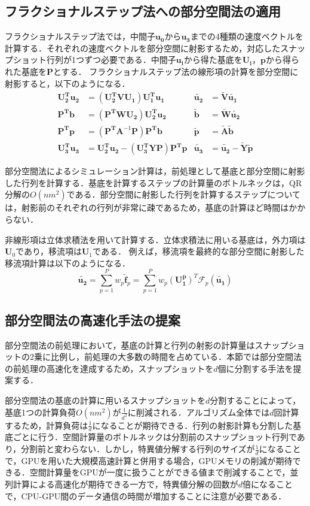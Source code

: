 \documentclass[uplatex,dvipdfmx,10pt,a4paper,notitlepage,oneside,twocolumn]{abst_jsarticle}
\begin{document}
\subsection{フラクショナルステップ法への部分空間法の適用}
フラクショナルステップ法では，中間子$\bm{u_0}$から$\bm{u_3}$までの4種類の速度ベクトルを計算する．それぞれの速度ベクトルを部分空間に射影するため，対応したスナップショット行列が1つずつ必要である．中間子$\bm{u_i}$から得た基底を$\bm{U_i}$，$\bm{p}$から得られた基底を$\bm{P}$とする．
フラクショナルステップ法の線形項の計算を部分空間に射影すると，以下のようになる．
\begin{align*}
 \bm{U_2^T}\bm{u_2}	& = (\bm{U_2^T}\bm{V}\bm{U_1})\bm{U_1^T}\bm{u_1} 					&\bm{\tilde{u_2}} 		&= \bm{\tilde{V}}\bm{\tilde{u_1}}	\\
 \bm{P^T}\bm{b}		& = (\bm{P^T}\bm{W}\bm{U_2})\bm{U_2^T}\bm{u_2}        				&\bm{\tilde{b}}			&= \bm{\tilde{W}}\bm{\tilde{u_2}}	\\
 \bm{P^T}\bm{p} 		&= (\bm{P^T}\bm{A}^{-1}\bm{P})\bm{P^T}\bm{b}						&\bm{\tilde{p}}			&= \bm{\tilde{A}}\bm{\tilde{b}}\\
 \bm{U_3^T}\bm{u_3} 	&=  \bm{U_2^T}\bm{u_2} - (\bm{U_3^T}\bm{Y}\bm{P})\bm{P^T}\bm{p}	&\bm{\tilde{u_3}}		&= \bm{\tilde{u_2}}  -  \bm{\tilde{Y}}\bm{\tilde{p}}
\end{align*}

部分空間法によるシミュレーション計算は，前処理として基底と部分空間に射影した行列を計算する．基底を計算するステップの計算量のボトルネックは，QR分解の$O(nm^2)$である．部分空間に射影した行列を計算するステップについては，射影前のそれぞれの行列が非常に疎であるため，基底の計算ほど時間はかからない．

非線形項は立体求積法を用いて計算する．立体求積法に用いる基底は，外力項は$\bm{U}_0$であり，移流項は$\bm{U}_1$である．
例えば，移流項を最終的な部分空間に射影した移流項計算は以下のようになる．
\[
	\bm{\tilde{u_2}} = \sum_{p=1}^Pw_p\bm{\tilde{f}}_p =   \sum_{p=1}^Pw_p(\bm{U^p_1})^T\mathcal{F}_p(\bm{\tilde{u_1}})
\]
\subsection{部分空間法の高速化手法の提案}
部分空間法の前処理において，基底の計算と行列の射影の計算量はスナップショットの$2$乗に比例し，前処理の大多数の時間を占めている．本節では部分空間法の前処理の高速化を達成するため，スナップショットを$d$個に分割する手法を提案する．

部分空間法の基底の計算に用いるスナップショットを$d$分割することによって，基底1つの計算負荷$O(nm^2)$が$\frac{1}{d^2}$に削減される．アルゴリズム全体では$d$回計算するため，計算負荷は$\frac{1}{d}$になることが期待できる．行列の射影計算も分割した基底ごとに行う．空間計算量のボトルネックは分割前のスナップショット行列であり，分割前と変わらない．しかし，特異値分解する行列のサイズが$\frac{1}{d}$になることで，GPUを用いた大規模高速計算と併用する場合，GPUメモリの削減が期待できる．空間計算量をGPUが一度に扱うことができる値まで削減することで，並列計算による高速化が期待できる一方で，特異値分解の回数が$d$倍になることで，CPU-GPU間のデータ通信の時間が増加することに注意が必要である．
\end{document}
